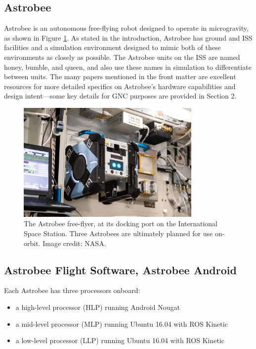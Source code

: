 \documentclass{article}
\begin{document}
\subsection{Astrobee}
Astrobee is an autonomous free-flying robot designed to operate in microgravity, as shown in Figure \ref{fig:astro}. As stated in the introduction, Astrobee has ground and ISS facilities and a simulation environment designed to mimic both of these environments as closely as possible. The Astrobee units on the ISS are named honey, bumble, and queen, and also use these names in simulation to differentiate between units. The many papers mentioned in the front matter are excellent resources for more detailed specifics on Astrobee's hardware capabilities and design intent---some key details for GNC purposes are provided in Section 2.

\begin{figure}[h!]
    \centering
    \includegraphics[width=0.8\textwidth]{img/nasa_astrobee.jpeg}
    \caption{The Astrobee free-flyer, at its docking port on the International Space Station. Three Astrobees are ultimately planned for use on-orbit. Image credit: NASA.}
    \label{fig:astro}
\end{figure}


\subsection{Astrobee Flight Software, Astrobee Android}

Each Astrobee has three processors onboard:
\begin{itemize}
    \item a high-level processor (HLP) running Android Nougat
    \item a mid-level processor (MLP) running Ubuntu 16.04 with ROS Kinetic
    \item a low-level processor (LLP) running Ubuntu 16.04 with ROS Kinetic
\end{itemize}
\end{document}
